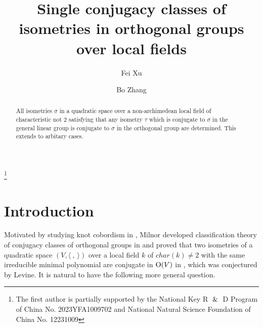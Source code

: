 \documentclass[12pt]{amsart}
\begin{document}
\newtheorem{thm}{Theorem}[section]
\newtheorem{lem}[thm]{Lemma}
\newtheorem{dfn}[thm]{Definition}
\newtheorem{cor}[thm]{Corollary}
\newtheorem{conj}[thm]{Conjecture}
\newtheorem{clm}[thm]{Claim}
\newtheorem{que}[thm]{Question}
\newtheorem{prop}[thm]{Proposition}


\theoremstyle{remark}
\newtheorem{exm}[thm]{Example}
\newtheorem{rem}[thm]{Remark}

\def\N{{\mathbb N}}
\def\G{{\mathbb G}}
\def\F{{\mathbb F}}
\def\Q{{\mathbb Q}}
\def\R{{\mathbb R}}
\def\C{{\mathbb C}}
\def\P{{\mathbb P}}
\def\A{{\mathbb A}}
\def\Z{{\mathbb Z}}
\def\v{{\mathbf v}}
\def\w{{\mathbf w}}
\def\x{{\mathbf x}}
\def\O{{\mathcal O}}
\def\M{{\mathcal M}}
\def\kbar{{\bar{k}}}
\def\tr{\mbox{Tr}}
\def\id{\mbox{id}}

\renewcommand{\theenumi}{\alph{enumi}}

\title[conjugacy class of an isometry in orthogonal groups]{Single conjugacy classes of isometries in orthogonal groups over local fields}


\author{Fei Xu}

\author{Bo Zhang}

\thanks{The first author is partially supported by the National Key R $\And$ D Program of China No. 2023YFA1009702 and National Natural Science Foundation of China No. 12231009}

\begin{abstract} All isometries $\sigma$ in a quadratic space over a non-archimedean local field of characteristic not 2 satisfying that any isometry $\tau$ which is conjugate to $\sigma$ in the general linear group is conjugate to $\sigma$ in the orthogonal group are determined. This extends \cite[Theorem 2.1]{Mil} to arbitary cases.
\end{abstract}

\maketitle

\vspace{-5pt}
\section{Introduction}


Motivated by studying knot cobordism in \cite{Le}, Milnor developed classification theory of conjugacy classes of orthogonal groups in \cite{Mil} and proved that two isometries of a quadratic space $(V, \langle \  , \  \rangle)$ over a local field $k$ of $char(k)\neq 2$ with the same irreducible minimal polynomial  are conjugate in ${\rm O}(V)$ in \cite[Theorem 2.1]{Mil}, which was conjectured by Levine.  It is natural to have the following more general question. 
\end{document}
